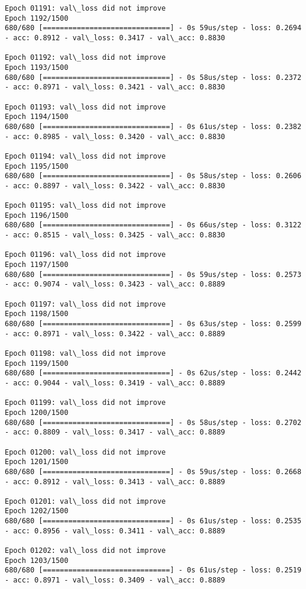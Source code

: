 \documentclass[11pt]{article}
\begin{document}
\begin{Verbatim}[commandchars=\\\{\}]
Epoch 01191: val\_loss did not improve
Epoch 1192/1500
680/680 [==============================] - 0s 59us/step - loss: 0.2694 - acc: 0.8912 - val\_loss: 0.3417 - val\_acc: 0.8830

Epoch 01192: val\_loss did not improve
Epoch 1193/1500
680/680 [==============================] - 0s 58us/step - loss: 0.2372 - acc: 0.8971 - val\_loss: 0.3421 - val\_acc: 0.8830

Epoch 01193: val\_loss did not improve
Epoch 1194/1500
680/680 [==============================] - 0s 61us/step - loss: 0.2382 - acc: 0.8985 - val\_loss: 0.3420 - val\_acc: 0.8830

Epoch 01194: val\_loss did not improve
Epoch 1195/1500
680/680 [==============================] - 0s 58us/step - loss: 0.2606 - acc: 0.8897 - val\_loss: 0.3422 - val\_acc: 0.8830

Epoch 01195: val\_loss did not improve
Epoch 1196/1500
680/680 [==============================] - 0s 66us/step - loss: 0.3122 - acc: 0.8515 - val\_loss: 0.3425 - val\_acc: 0.8830

Epoch 01196: val\_loss did not improve
Epoch 1197/1500
680/680 [==============================] - 0s 59us/step - loss: 0.2573 - acc: 0.9074 - val\_loss: 0.3423 - val\_acc: 0.8889

Epoch 01197: val\_loss did not improve
Epoch 1198/1500
680/680 [==============================] - 0s 63us/step - loss: 0.2599 - acc: 0.8971 - val\_loss: 0.3422 - val\_acc: 0.8889

Epoch 01198: val\_loss did not improve
Epoch 1199/1500
680/680 [==============================] - 0s 62us/step - loss: 0.2442 - acc: 0.9044 - val\_loss: 0.3419 - val\_acc: 0.8889

Epoch 01199: val\_loss did not improve
Epoch 1200/1500
680/680 [==============================] - 0s 58us/step - loss: 0.2702 - acc: 0.8809 - val\_loss: 0.3417 - val\_acc: 0.8889

Epoch 01200: val\_loss did not improve
Epoch 1201/1500
680/680 [==============================] - 0s 59us/step - loss: 0.2668 - acc: 0.8912 - val\_loss: 0.3413 - val\_acc: 0.8889

Epoch 01201: val\_loss did not improve
Epoch 1202/1500
680/680 [==============================] - 0s 61us/step - loss: 0.2535 - acc: 0.8956 - val\_loss: 0.3411 - val\_acc: 0.8889

Epoch 01202: val\_loss did not improve
Epoch 1203/1500
680/680 [==============================] - 0s 61us/step - loss: 0.2519 - acc: 0.8971 - val\_loss: 0.3409 - val\_acc: 0.8889


\end{Verbatim}
\end{document}

